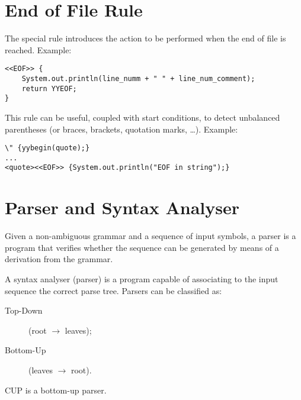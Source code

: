 \section{End of File Rule}
The special rule  introduces the action to be performed when the end of file is reached.
Example:
\begin{lstlisting}
<<EOF>> {
    System.out.println(line_numm + " " + line_num_comment);
    return YYEOF;
}
\end{lstlisting}
This rule can be useful, coupled with start conditions, to detect unbalanced parentheses (or braces, brackets, quotation marks, \ldots).
Example:
\begin{lstlisting}
\" {yybegin(quote);}
...
<quote><<EOF>> {System.out.println("EOF in string");}
\end{lstlisting}

\section{Parser and Syntax Analyser}
Given a non-ambiguous grammar and a sequence of input symbols, a parser is a program that verifies whether the sequence can be generated by means of a derivation from the grammar.

A syntax analyser (parser) is a program capable of associating to the input sequence the correct parse tree.
Parsers can be classified as:
\begin{description}
    \item[Top-Down] (root $\to$ leaves);
    \item[Bottom-Up] (leaves $\to$ root).
\end{description}
CUP is a bottom-up parser.